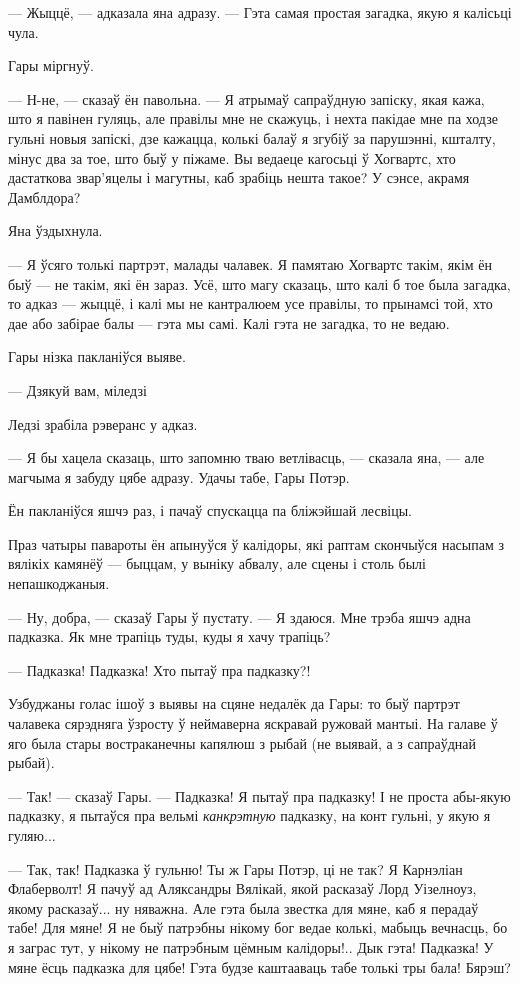 --- Жыццё, --- адказала яна адразу. --- Гэта самая простая загадка, якую я калісьці чула.

Гары міргнуў.

--- Н-не, --- сказаў ён павольна. --- Я атрымаў сапраўдную запіску, якая кажа, што 
я павінен гуляць, але правілы мне не скажуць, і нехта пакідае мне па ходзе гульні 
новыя запіскі, дзе кажацца, колькі балаў я згубіў за парушэнні, кшталту,
мінус два за тое, што быў у піжаме. Вы ведаеце кагосьці ў Хогвартс, 
хто дастаткова звар'яцелы і магутны, каб зрабіць нешта такое?
У сэнсе, акрамя Дамблдора?

Яна ўздыхнула.

--- Я ўсяго толькі партрэт, малады чалавек. Я памятаю Хогвартс такім, якім ён быў --- не
такім, які ён зараз. Усё, што магу сказаць, што калі б тое была загадка, то адказ ---
жыццё, і калі мы не кантралюем усе правілы, то прынамсі той, хто дае або забірае балы ---
гэта мы самі. Калі гэта не загадка, то не ведаю.

Гары нізка пакланіўся выяве. 

--- Дзякуй вам, міледзі

Ледзі зрабіла рэверанс у адказ.

--- Я бы хацела сказаць, што запомню тваю ветлівасць, --- сказала яна, --- 
але магчыма я забуду цябе адразу. Удачы табе, Гары Потэр.

Ён пакланіўся яшчэ раз, і пачаў спускацца па бліжэйшай лесвіцы.

Праз чатыры павароты ён апынуўся ў калідоры, які раптам скончыўся насыпам з 
вялікіх камянёў --- быццам, у выніку абвалу, але сцены і столь былі непашкоджаныя.

--- Ну, добра, --- сказаў Гары ў пустату. --- Я здаюся. Мне трэба яшчэ адна падказка. 
Як мне трапіць туды, куды я хачу трапіць?

--- Падказка! Падказка! Хто пытаў пра падказку?!

Узбуджаны голас ішоў з выявы на сцяне недалёк да Гары: то быў партрэт чалавека
сярэдняга ўзросту ў неймаверна яскравай ружовай мантыі. На галаве ў яго была стары 
востраканечны капялюш з рыбай (не выявай, а з сапраўднай рыбай).


--- Так! --- сказаў Гары. --- Падказка! Я пытаў пра  падказку! І не проста 
абы-якую падказку, я пытаўся пра вельмі \emph{канкрэтную} падказку, 
на конт гульні, у якую я гуляю...

--- Так, так! Падказка ў гульню! Ты ж Гары Потэр, ці не так? Я Карнэліан Флаберволт!
Я пачуў ад Аляксандры Вялікай, якой расказаў Лорд Уізелноуз, якому расказаў... ну няважна.
Але гэта была звестка для мяне, каб я перадаў табе! Для мяне! Я не быў патрэбны нікому 
бог ведае колькі, мабыць вечнасць, бо я заграс тут, у нікому не патрэбным цёмным калідоры!..
Дык гэта! Падказка! У мяне ёсць падказка для цябе! Гэта будзе каштааваць табе толькі
тры бала! Бярэш?

